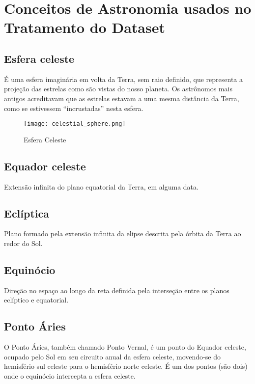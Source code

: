 \documentclass[12pt, a4paper]{article}
\begin{document}
	\section{Conceitos de Astronomia usados no Tratamento do Dataset
	}
	\subsection{Esfera celeste}
	É uma esfera imaginária em volta da Terra, sem raio definido, que representa a projeção das estrelas como são vistas do nosso planeta. Os astrônomos mais antigos acreditavam que as estrelas estavam a uma mesma distância da Terra, como se estivessem “incrustadas” nesta esfera.

	\begin{figure}[h]
		\centering
		\texttt{[image: celestial\_sphere.png]}
		\caption{Esfera Celeste}
		\label{fig:Esfera_Celeste}
	\end{figure}

	\subsection{Equador celeste}
	
	Extensão infinita do plano equatorial da Terra, em alguma data.

	\subsection{Eclíptica}
	
	Plano formado pela extensão infinita da elipse descrita pela órbita da Terra ao redor do Sol.
	
	\subsection{Equinócio}
	
	Direção no espaço ao longo da reta definida pela interseção entre os planos eclíptico e equatorial.

	\subsection{Ponto Áries}
	
	O Ponto Áries, também chamado Ponto Vernal,	é um ponto do Equador celeste, ocupado pelo Sol em seu circuito anual da esfera celeste, movendo-se do hemisfério
	sul celeste para o hemisfério norte celeste. É um dos pontos (são dois) onde o equinócio intercepta a esfera celeste. 
	
\end{document}
